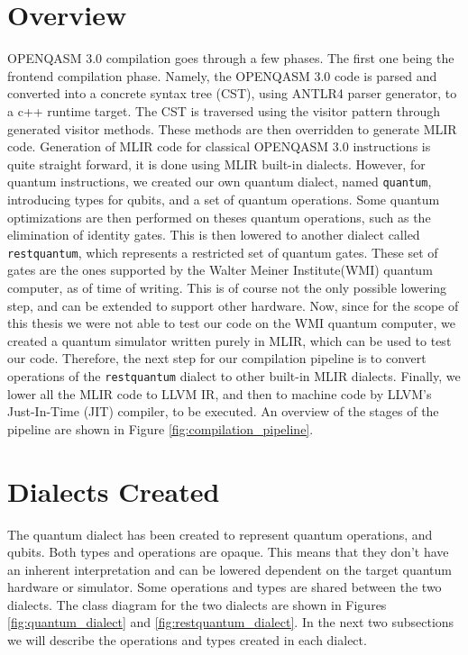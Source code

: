 \section{Overview}
\label{sec:overview}
OPENQASM 3.0 compilation goes through a few phases. The first one being the
frontend compilation phase. Namely, the OPENQASM 3.0 code is parsed and
converted into a concrete syntax tree (CST), using ANTLR4 parser generator, to a
c++ runtime target. The CST is traversed using the visitor pattern through
generated visitor methods. These methods are then overridden to generate MLIR
code. Generation of MLIR code for classical OPENQASM 3.0 instructions is quite
straight forward, it is done using MLIR built-in dialects. However, for quantum
instructions, we created our own quantum dialect, named \texttt{quantum},
introducing types for qubits, and a set of quantum operations. Some quantum
optimizations are then performed on theses quantum operations, such as the
elimination of identity gates. This is then lowered to another dialect called
\texttt{restquantum}, which represents a restricted set of quantum gates. These
set of gates are the ones supported by the Walter Meiner Institute(WMI) quantum
computer, as of time of writing. This is of course not the only possible
lowering step, and can be extended to support other hardware. Now, since for the
scope of this thesis we were not able to test our code on the WMI quantum
computer, we created a quantum simulator written purely in MLIR, which can be
used to test our code. Therefore, the next step for our compilation pipeline is
to convert operations of
the \texttt{restquantum} dialect to other built-in MLIR dialects. Finally, we
lower all the MLIR code to LLVM IR, and then to machine code by LLVM's
Just-In-Time (JIT) compiler, to be executed.
An overview of the stages of the pipeline are shown in Figure \ref{fig:compilation_pipeline}.

\section{Dialects Created}
The quantum dialect has been created to represent quantum operations, and
qubits. Both types and operations are opaque. This means that they don't have an
inherent interpretation and can be lowered dependent on the target quantum
hardware or simulator.  Some operations and types are shared between the two dialects.
The class diagram for the two dialects are shown in Figures \ref{fig:quantum_dialect} and \ref{fig:restquantum_dialect}.
In the next two subsections we will describe the operations and types created in each dialect.
